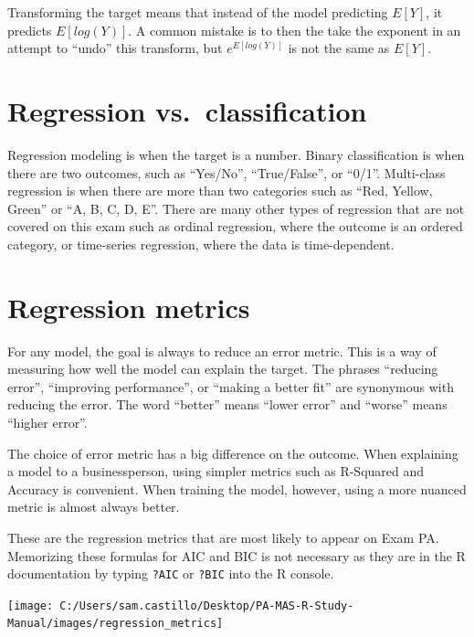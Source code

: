 \documentclass[
  openany]{book}
\begin{document}
Transforming the target means that instead of the model predicting \(E[Y]\), it predicts \(E[log(Y)]\). A common mistake is to then the take the exponent in an attempt to ``undo'' this transform, but \(e^{E[log(Y)]}\) is not the same as \(E[Y]\).

\hypertarget{regression-vs.-classification}{%
\section{Regression vs.~classification}\label{regression-vs.-classification}}

Regression modeling is when the target is a number. Binary classification is when there are two outcomes, such as ``Yes/No'', ``True/False'', or ``0/1''. Multi-class regression is when there are more than two categories such as ``Red, Yellow, Green'' or ``A, B, C, D, E''. There are many other types of regression that are not covered on this exam such as ordinal regression, where the outcome is an ordered category, or time-series regression, where the data is time-dependent.

\hypertarget{regression-metrics}{%
\section{Regression metrics}\label{regression-metrics}}

For any model, the goal is always to reduce an error metric. This is a way of measuring how well the model can explain the target. The phrases ``reducing error'', ``improving performance'', or ``making a better fit'' are synonymous with reducing the error. The word ``better'' means ``lower error'' and ``worse'' means ``higher error''.

The choice of error metric has a big difference on the outcome. When explaining a model to a businessperson, using simpler metrics such as R-Squared and Accuracy is convenient. When training the model, however, using a more nuanced metric is almost always better.

These are the regression metrics that are most likely to appear on Exam PA. Memorizing these formulas for AIC and BIC is not necessary as they are in the R documentation by typing \texttt{?AIC} or \texttt{?BIC} into the R console.

\begin{center}\texttt{[image: C:/Users/sam.castillo/Desktop/PA-MAS-R-Study-Manual/images/regression\_metrics]} \end{center}
\end{document}
